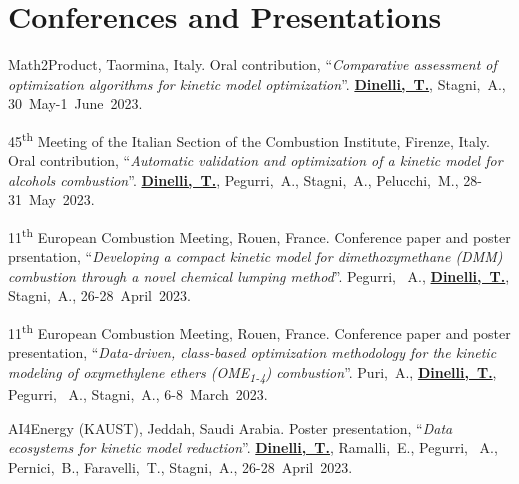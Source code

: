 
\section{\sc Conferences and Presentations}
\begin{etaremune}
   \item
      Math2Product, Taormina, Italy. Oral contribution, ``{\it Comparative
      assessment of optimization algorithms for kinetic model optimization}''.
      {\bf \underline{Dinelli,~T.}}, Stagni,~A.,
      30~May-1~June~2023.

   \item
      45\textsuperscript{th} Meeting of the Italian Section of the Combustion Institute,
      Firenze, Italy. Oral contribution, ``{\it Automatic validation and optimization
      of a kinetic model for alcohols combustion}''. {\bf \underline{Dinelli,~T.}},
      Pegurri,~A., Stagni,~A., Pelucchi,~M.,
      28-31~May~2023.

   \item
      11\textsuperscript{th} European Combustion Meeting, Rouen, France. Conference paper
      and poster prsentation, ``{\it Developing a compact kinetic model for
      dimethoxymethane (DMM) combustion through a novel chemical lumping method}''.
      Pegurri, ~A., {\bf \underline{Dinelli,~T.}}, Stagni,~A.,
      26-28~April~2023.

   \item
      11\textsuperscript{th} European Combustion Meeting, Rouen, France. Conference paper
      and poster presentation, ``{\it Data-driven, class-based optimization methodology
      for the kinetic modeling of oxymethylene ethers (OME\textsubscript{1-4}) combustion}''.
      Puri,~A., {\bf \underline{Dinelli,~T.}}, Pegurri, ~A., Stagni,~A.,
      6-8~March~2023.

   \item
      AI4Energy (KAUST), Jeddah, Saudi Arabia. Poster presentation, ``{\it Data ecosystems for
      kinetic model reduction}''. {\bf \underline{Dinelli,~T.}}, Ramalli,~E., Pegurri,
      ~A., Pernici,~B., Faravelli,~T., Stagni,~A.,
      26-28~April~2023.


\end{etaremune}

